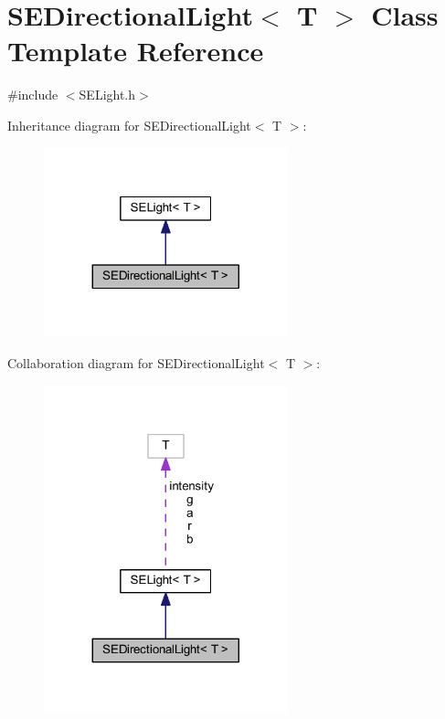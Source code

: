 \section{S\+E\+Directional\+Light$<$ T $>$ Class Template Reference}
\label{class_s_e_directional_light}


{\ttfamily \#include $<$S\+E\+Light.\+h$>$}



Inheritance diagram for S\+E\+Directional\+Light$<$ T $>$\+:
\nopagebreak
\begin{figure}[H]
\begin{center}
\leavevmode
\includegraphics[width=200pt]{class_s_e_directional_light__inherit__graph}
\end{center}
\end{figure}


Collaboration diagram for S\+E\+Directional\+Light$<$ T $>$\+:
\nopagebreak
\begin{figure}[H]
\begin{center}
\leavevmode
\includegraphics[width=200pt]{class_s_e_directional_light__coll__graph}
\end{center}
\end{figure}
